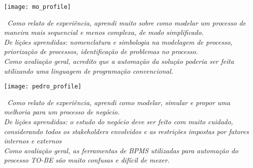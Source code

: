 \newpage
\vspace*{\fill}
\begin{center}
	\texttt{[image: mo\_profile]}
\end{center}
\ \indent \emph{Como relato de experiência, aprendi muito sobre como modelar um processo de maneira mais sequencial e menos complexa, de modo simplificado.}
\\ \indent \emph{De lições aprendidas: nomenclatura e simbologia na modelagem de processo, priorização de processos, identificação de problemas no processo.}
\\ \indent \emph{Como avaliação geral, acredito que a automação da solução poderia ser feita utilizando uma linguagem de programação convencional.}
\vspace*{\fill}

\newpage
\vspace*{\fill}
\begin{center}
	\texttt{[image: pedro\_profile]}
\end{center}
\ \indent \emph{Como relato de experiência, aprendi como modelar, simular e propor uma melhoria para um processo de negócio.}
\\ \indent \emph{De lições aprendidas: o estudo do negócio deve ser feito com muito cuidado, considerando todos os stakeholders envolvidos e as restrições impostas por fatores internos e externos}
\\ \indent \emph{Como avaliação geral, as ferramentas de BPMS utilizadas para automação do processo TO-BE são muito confusas e difícil de mexer.}
\vspace*{\fill}

